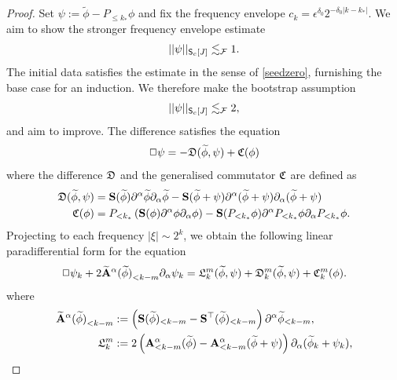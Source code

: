 \begin{proof}
	Set $\psi:=  \widetilde \phi - P_{\leq k_*} \phi$ and fix the frequency envelope $c_k = \epsilon^{\delta_0} 2^{-\delta_0 |k - k_*|}$. We aim to show the stronger frequency envelope estimate
		\begin{equation}
			||\psi||_{\mathsf S_c[J]} \lesssim_\mathcal F 1.
		\end{equation}
	The initial data satisfies the estimate in the sense of \eqref{seedzero}, furnishing the base case for an induction. We therefore make the bootstrap assumption
		\begin{equation}
			||\psi||_{\mathsf S_c[J]} \lesssim_\mathcal F 2,
		\end{equation}	
	and aim to improve. The difference satisfies the equation 
		\begin{equation}
			\Box \psi = - \mathfrak D (\widetilde \phi, \psi) + \mathfrak C(\phi)
			\label{eq:wavelow}
		\end{equation}
	where the difference $\mathfrak D$ and the generalised commutator $\mathfrak C$ are defined as 
		\begin{align*}
			\mathfrak D(\widetilde \phi, \psi) 
				&= {\bf S}  (\widetilde \phi) \partial^\alpha \widetilde\phi \partial_\alpha \widetilde\phi - {\bf S} (\widetilde \phi + \psi) \partial^\alpha (\widetilde \phi + \psi) \partial_\alpha (\widetilde\phi + \psi)\\
			\mathfrak C(\phi)
				&= P_{< k_*} \left( {\bf S}  (\phi) \partial^\alpha \phi \partial_\alpha \phi \right) - {\bf S}  (P_{< k_*} \phi) \partial^\alpha P_{< k_*} \phi \partial_\alpha P_{< k_*} \phi.	
		\end{align*}
	Projecting to each frequency $|\xi| \sim 2^k$, we obtain the following linear paradifferential form for the equation 	
		\begin{equation}
			\Box \psi_k + 2 {\widetilde {{\bf A}}^\alpha (\widetilde\phi)}_{< k - m} \partial_\alpha \psi_k = \mathfrak L_k^m (\widetilde \phi, \psi) + \mathfrak D_k^m (\widetilde \phi, \psi)  + \mathfrak C_k^m (\phi).
			\label{eq:wavelowpara}
		\end{equation}	
	where
		\begin{align*}
			{\widetilde {{\bf A}}^\alpha (\widetilde\phi)}_{< k - m} 
				&:= \left( {\bf S} (\widetilde \phi)_{ <k - m} - {\bf S}^\top (\widetilde \phi)_{< k - m} \right) \partial^\alpha \widetilde \phi_{< k - m},\\
			\mathfrak L^m_k 
				&:= 2 \left( {\bf A}^\alpha_{< k - m} (\widetilde \phi) - {\bf A}^\alpha_{< k - m} (\widetilde \phi + \psi) \right) \partial_\alpha (\widetilde \phi_k + \psi_k),
		\end{align*}

\end{proof}
